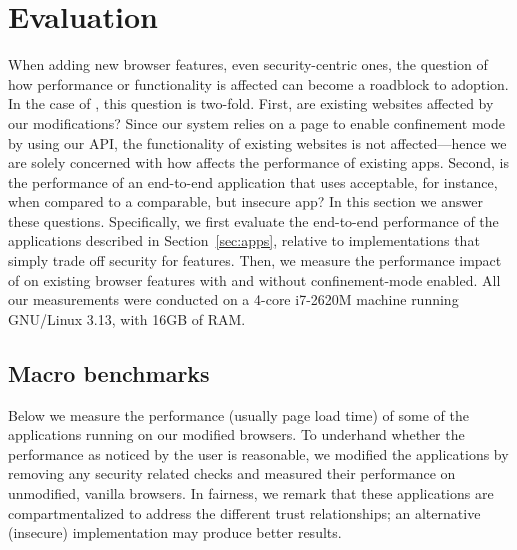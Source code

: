 \section{Evaluation}
\label{sec:eval}

When adding new browser features, even security-centric ones, the
question of how performance or functionality is affected can become a
roadblock to adoption.
%
In the case of \sys{}, this question is two-fold.
%
First, are existing websites affected by our modifications?
%
Since our system relies on a page to enable confinement mode by using
our API, the functionality of existing websites is not
affected---hence we are solely concerned with how \sys{} affects the
performance of existing apps.
%
Second, is the performance of an end-to-end application that uses
\sys{} acceptable, for instance, when compared to a comparable, but
insecure app?
%
In this section we answer these questions.
%
Specifically, we first evaluate the end-to-end performance of the
applications described in Section~\ref{sec:apps}, relative to
implementations that simply trade off security for features.
%
Then, we measure the performance impact of \sys{} on existing browser
features with and without confinement-mode enabled.
%
All our measurements were conducted on a 4-core i7-2620M machine
running GNU/Linux 3.13, with 16GB of RAM.
%


\subsection{Macro benchmarks}
\label{sec:eval:macro}

Below we measure the performance (usually page load time) of some of
the applications running on our modified browsers.
%
To underhand whether the performance as noticed by the user is
reasonable, we modified the applications by removing any security
related checks and measured their performance on unmodified, vanilla
browsers.
%
In fairness, we remark that these applications are compartmentalized
to address the different trust relationships; an alternative
(insecure) implementation may produce better results.

